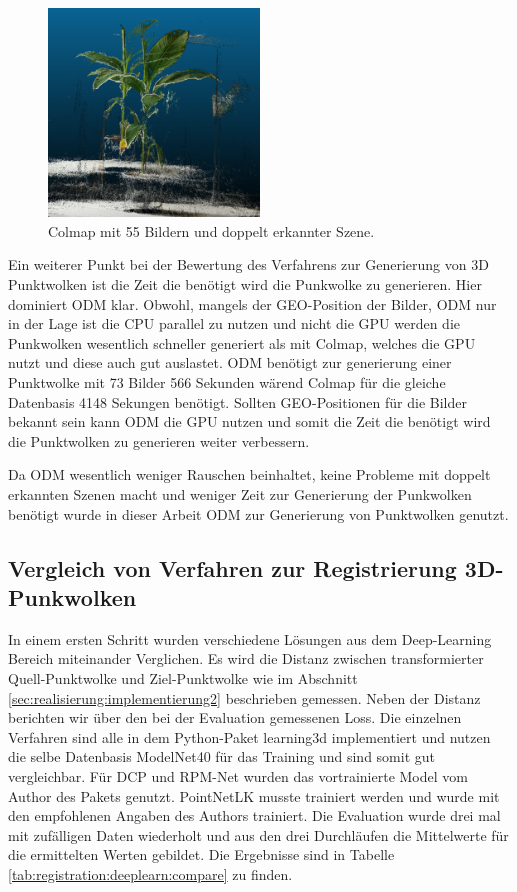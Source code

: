 \documentclass[12pt,titlepage, twoside]{article}
\begin{document}
\begin{figure}
    \centering
        \includegraphics[width=0.5\textwidth]{./Images/ColmapDuplicatedScene.png}
        \caption{Colmap mit 55 Bildern und doppelt erkannter Szene.}
        \label{fig:ColmapDuplicatedScene}
\end{figure}

Ein weiterer Punkt bei der Bewertung des Verfahrens zur Generierung von 3D Punktwolken ist die Zeit die benötigt wird die Punkwolke zu generieren.
Hier dominiert ODM klar. Obwohl, mangels der GEO-Position der Bilder, ODM nur in der Lage ist die CPU parallel zu nutzen und nicht die GPU werden die Punkwolken wesentlich schneller generiert als mit Colmap, welches die GPU nutzt und diese auch gut auslastet.
ODM benötigt zur generierung einer Punktwolke mit 73 Bilder 566 Sekunden wärend Colmap für die gleiche Datenbasis 4148 Sekungen benötigt. 
Sollten GEO-Positionen für die Bilder bekannt sein kann ODM die GPU nutzen und somit die Zeit die benötigt wird die Punktwolken zu generieren weiter verbessern.

Da ODM wesentlich weniger Rauschen beinhaltet, keine Probleme mit doppelt erkannten Szenen macht und weniger Zeit zur Generierung der Punkwolken benötigt wurde in dieser Arbeit ODM zur Generierung von Punktwolken genutzt.

\subsection{Vergleich von Verfahren zur Registrierung 3D-Punkwolken}

In einem ersten Schritt wurden verschiedene Lösungen aus dem Deep-Learning Bereich miteinander Verglichen. 
Es wird die Distanz zwischen transformierter Quell-Punktwolke und Ziel-Punktwolke wie im Abschnitt \ref{sec:realisierung:implementierung2} beschrieben gemessen. Neben der Distanz berichten wir über den bei der Evaluation gemessenen Loss.
Die einzelnen Verfahren sind alle in dem Python-Paket \glqq learning3d\grqq{} implementiert und nutzen die selbe Datenbasis ModelNet40 für das Training und sind somit gut vergleichbar. Für DCP und RPM-Net wurden das vortrainierte Model vom Author des Pakets genutzt.
PointNetLK musste trainiert werden und wurde mit den empfohlenen Angaben des Authors trainiert. Die Evaluation wurde drei mal mit zufälligen Daten wiederholt und aus den drei Durchläufen die Mittelwerte für die ermittelten Werten gebildet.
Die Ergebnisse sind in Tabelle \ref{tab:registration:deeplearn:compare} zu finden.
\end{document}
